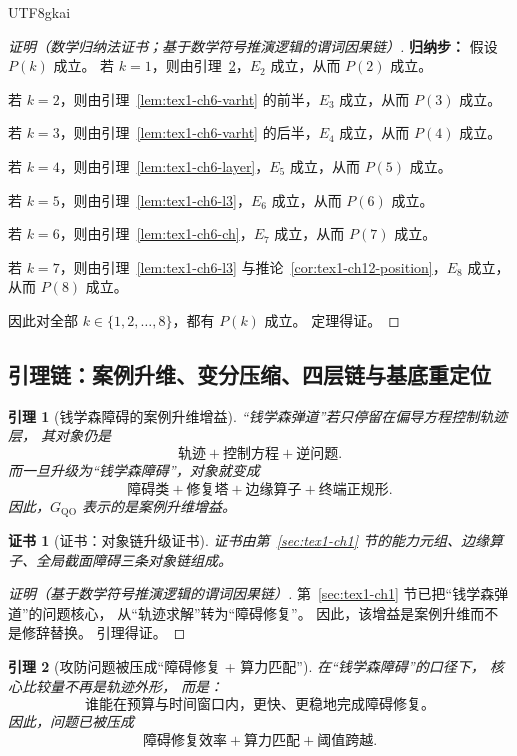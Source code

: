 \documentclass[12pt]{article}
\newtheorem{lemma}{引理}[section]
\newtheorem{Certificate}{证书}[section]
\begin{document}
\begin{CJK*}{UTF8}{gkai}
\begin{proof}[证明（数学归纳法证书；基于数学符号推演逻辑的谓词因果链）]
\textbf{归纳步：}
假设 \(P(k)\) 成立。
若 \(k=1\)，则由引理~\ref{lem:tex1-ch6-cb}，\(E_2\) 成立，从而 \(P(2)\) 成立。

若 \(k=2\)，则由引理~\ref{lem:tex1-ch6-varht} 的前半，\(E_3\) 成立，从而 \(P(3)\) 成立。

若 \(k=3\)，则由引理~\ref{lem:tex1-ch6-varht} 的后半，\(E_4\) 成立，从而 \(P(4)\) 成立。

若 \(k=4\)，则由引理~\ref{lem:tex1-ch6-layer}，\(E_5\) 成立，从而 \(P(5)\) 成立。

若 \(k=5\)，则由引理~\ref{lem:tex1-ch6-l3}，\(E_6\) 成立，从而 \(P(6)\) 成立。

若 \(k=6\)，则由引理~\ref{lem:tex1-ch6-ch}，\(E_7\) 成立，从而 \(P(7)\) 成立。

若 \(k=7\)，则由引理~\ref{lem:tex1-ch6-l3} 与推论~\ref{cor:tex1-ch12-position}，\(E_8\) 成立，从而 \(P(8)\) 成立。

因此对全部 \(k\in\{1,2,\dots,8\}\)，都有 \(P(k)\) 成立。
定理得证。
\end{proof}

\subsection{引理链：案例升维、变分压缩、四层链与基底重定位}
\label{subsec:tex1-ch6-lemmas}

\begin{lemma}[钱学森障碍的案例升维增益]
\label{lem:tex1-ch6-qo}
“钱学森弹道”若只停留在偏导方程控制轨迹层，
其对象仍是
\[
  \text{轨迹}
  +
  \text{控制方程}
  +
  \text{逆问题}.
\]
而一旦升级为“钱学森障碍”，对象就变成
\[
  \text{障碍类}
  +
  \text{修复塔}
  +
  \text{边缘算子}
  +
  \text{终端正规形}.
\]
因此，\(G_{\mathrm{QO}}\) 表示的是案例升维增益。
\end{lemma}

\begin{Certificate}[证书：对象链升级证书]
\label{cert:tex1-ch6-qo}
证书由第~\ref{sec:tex1-ch1} 节的能力元组、边缘算子、全局截面障碍三条对象链组成。
\end{Certificate}

\begin{proof}[证明（基于数学符号推演逻辑的谓词因果链）]
第~\ref{sec:tex1-ch1} 节已把“钱学森弹道”的问题核心，
从“轨迹求解”转为“障碍修复”。
因此，该增益是案例升维而不是修辞替换。
引理得证。
\end{proof}

\begin{lemma}[攻防问题被压成“障碍修复 + 算力匹配”]
\label{lem:tex1-ch6-cb}
在“钱学森障碍”的口径下，
核心比较量不再是轨迹外形，
而是：
\[
  \text{谁能在预算与时间窗口内，更快、更稳地完成障碍修复。}
\]
因此，问题已被压成
\[
  \text{障碍修复效率}
  +
  \text{算力匹配}
  +
  \text{阈值跨越}.
\]
\end{lemma}


\end{CJK*}
\end{document}
